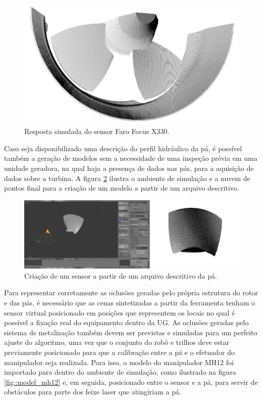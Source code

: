  \begin{figure}[H]
	\centering
	\includegraphics[width=0.9\columnwidth]{figs/calibracao/blensor_faro}
	\caption{Resposta simulada do sensor Faro Focus X330.}
    \label{fig::blensor_faro}
\end{figure}	


Caso seja disponibilizado uma descrição do perfil hidráulico da pá, é possível
também a geração de modelos sem a necessidade de uma inspeção prévia em uma
unidade geradora, na qual haja a presença de dados nas pás, para a aquisição de
dados sobre a turbina. A figura \ref{fig::modelo_pa} ilustra o ambiente de simulação e a
nuvem de pontos final para a criação de um modelo a partir de um arquivo
descritivo. 


\begin{figure}[h!]
	\centering
	\includegraphics[width=0.9\columnwidth]{figs/calibracao/blensor_pa_sim}
	\caption{Criação de um sensor a partir de um arquivo descritivo da pá.}
    \label{fig::modelo_pa}
\end{figure}

Para representar corretamente as oclusões geradas pelo própria estrutura do
rotor e das pás, é necessário que as cenas sintetizadas a partir da ferramenta
tenham o sensor virtual posicionado em posições que representem os locais no
qual é possível a fixação real do equipamento dentro da UG. As oclusões geradas
pelo sistema de metalização também devem ser previstas e simuladas para um
perfeito ajuste do algoritmo, uma vez que o conjunto do robô e trilhos deve
estar previamente posicionado para que a calibração entre a pá e o efetuador do
manipulador seja realizada. Para isso, o modelo do manipulador MH12 foi
importado para dentro do ambiente de simulação, como ilustrado na figura
\ref{fig::model_mh12} e, em seguida, posicionado entre o sensor e a pá, para
servir de obstáculos para parte dos feixe laser que atingiriam a pá.


